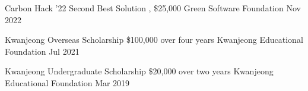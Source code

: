 

\begin{cvhonors}

  \cvhonor
    {Carbon Hack '22 Second Best Solution} %
    {\href{https://taikai.network/gsf/hackathons/carbonhack22/projects/cl95qxjpa70555701uhg96r0ek6/idea}{}, \$25,000} %
    {Green Software Foundation} %
    {Nov 2022} %

  \cvhonor
    {Kwanjeong Overseas Scholarship} %
    {\$100,000 over four years} %
    {Kwanjeong Educational Foundation} %
    {Jul 2021} %

  \cvhonor
    {Kwanjeong Undergraduate Scholarship} %
    {\$20,000 over two years} %
    {Kwanjeong Educational Foundation} %
    {Mar 2019} %

\end{cvhonors}
